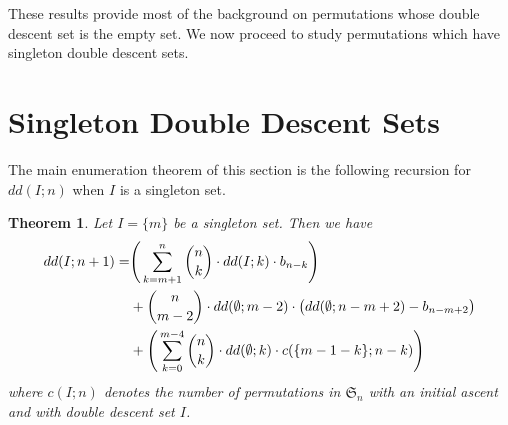 \documentclass[11pt, a4paper, reqno]{article}
\numberwithin{equation}{section}
\newtheorem{theorem}{Theorem}[section]
\theoremstyle{definition}
\begin{document}
	These results provide most of the background on permutations whose double descent set is the empty set. We now proceed to study permutations which have singleton double descent sets.
	
	\section{Singleton Double Descent Sets}\label{singletonddes}
	 The main enumeration theorem of this section is the following recursion for $dd(I;n)$ when $I$ is a singleton set.
	
	\begin{theorem}\label{recursion1}
		Let $I = \{m\}$ be a singleton set. Then we have 
		\begin{equation}\label{eq1}
		\begin{split}	
		dd(I; n+1) = & \Bigg(\sum_{k = m+1}^n \dbinom{n}{k}\cdot dd(I; k)\cdot b_{n-k}\Bigg) \\
		& + \dbinom{n}{m-2}\cdot dd(\emptyset;m-2)\cdot \big(dd(\emptyset;n-m+2) - b_{n-m+2}\big) \\
		& + \Bigg(\sum_{k=0}^{m-4}\dbinom{n}{k}\cdot dd(\emptyset;k)\cdot 
		c(\{m-1-k\}; n-k)\Bigg)
		\end{split}
		\end{equation}
		where $c(I; n)$ denotes the number of permutations in $\mathfrak{S}_n$ with an initial ascent and with double descent set $I$.
	\end{theorem}
	
\end{document}

